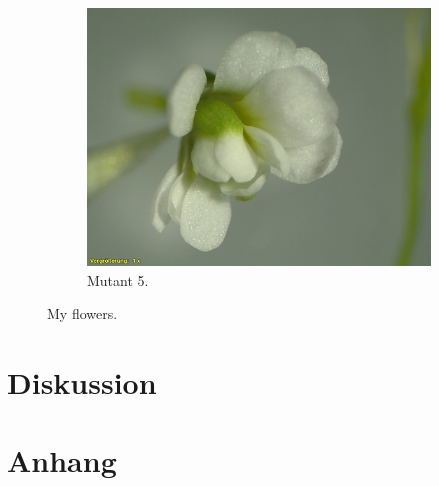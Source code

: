 \documentclass[10pt,a4paper]{article}
\begin{document}
\begin{figure}[!tbp]
\begin{subfigure}[b]{0.45\textwidth}
				\includegraphics[width=\textwidth]{5_O+A(MU).jpg}
				\caption{Mutant 5.}
				\label{fig:f5}
			\end{subfigure}
			\caption{My flowers.}
		\end{figure}

	\section{Diskussion}

	\section{Anhang}

	

	
\end{document}
